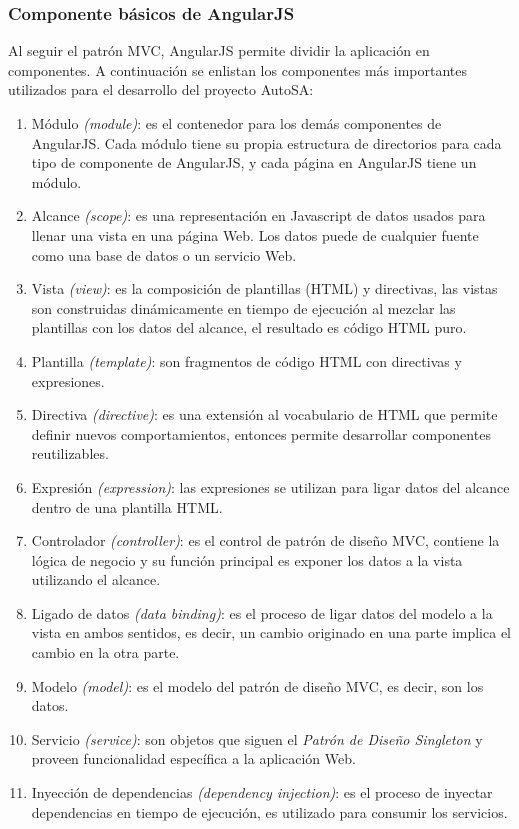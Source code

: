 \subsubsection{Componente básicos de AngularJS}
Al seguir el patrón MVC, AngularJS permite dividir la aplicación en componentes. A continuación se enlistan los componentes más importantes utilizados para el desarrollo del proyecto AutoSA\cite{FullStackAngularJS, LearningAngularJS, AngularJSEssentials}:
\begin{enumerate}
	\item Módulo \textit{(module)}: es el contenedor para los demás componentes de AngularJS. Cada módulo tiene su propia estructura de directorios para cada tipo de componente de AngularJS, y cada página en AngularJS tiene un módulo.
	\item Alcance \textit{(scope)}: es una representación en Javascript de datos usados para llenar una vista en una página Web. Los datos puede de cualquier fuente como una base de datos o un servicio Web.
	\item Vista \textit{(view)}: es la composición de plantillas (HTML) y directivas, las vistas son construidas dinámicamente en tiempo de ejecución al mezclar las plantillas con los datos del alcance, el resultado es código HTML puro.
	\item Plantilla \textit{(template)}: son fragmentos de código HTML con directivas y expresiones.
	\item Directiva \textit{(directive)}: es una extensión al vocabulario de HTML que permite definir nuevos comportamientos, entonces permite desarrollar componentes reutilizables.
	\item Expresión \textit{(expression)}: las expresiones se utilizan para ligar datos del alcance dentro de una plantilla HTML.
	\item Controlador \textit{(controller)}: es el control de patrón de diseño MVC, contiene la lógica de negocio y su función principal es exponer los datos a la vista utilizando el alcance.
	\item Ligado de datos \textit{(data binding)}: es el proceso de ligar datos del modelo a la vista en ambos sentidos, es decir, un cambio originado en una parte implica el cambio en la otra parte.
	\item Modelo \textit{(model)}: es el modelo del patrón de diseño MVC, es decir, son los datos.
	\item Servicio \textit{(service)}: son objetos que siguen el \textit{Patrón de Diseño Singleton} y proveen funcionalidad específica a la aplicación Web.
	\item Inyección de dependencias \textit{(dependency injection)}: es el proceso de inyectar dependencias en tiempo de ejecución, es utilizado para consumir los servicios.
\end{enumerate}

